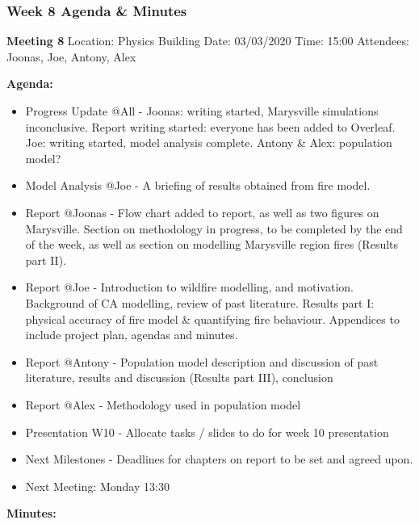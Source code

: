 \subsubsection*{Week 8 Agenda \& Minutes}
\textbf{Meeting 8}\newline
Location: Physics Building\newline
Date: 03/03/2020\newline
Time: 15:00\newline
Attendees: Joonas, Joe, Antony, Alex

\noindent \textbf{Agenda:}
\begin{itemize}
    \item Progress Update @All - Joonas: writing started, Marysville simulations inconclusive. Report writing started: everyone has been added to Overleaf. Joe: writing started, model analysis complete. Antony \& Alex: population model?
    \item Model Analysis @Joe - A briefing of results obtained from fire model.
    \item Report @Joonas - Flow chart added to report, as well as two figures on Marysville. Section on methodology in progress, to be completed by the end of the week, as well as section on modelling Marysville region fires (Results part II).
    \item Report @Joe - Introduction to wildfire modelling, and motivation. Background of CA modelling, review of past literature. Results part I: physical accuracy of fire model \& quantifying fire behaviour. Appendices to include project plan, agendas and minutes.
    \item Report @Antony - Population model description and discussion of past literature, results and discussion (Results part III), conclusion
    \item Report @Alex - Methodology used in population model
    \item Presentation W10 - Allocate tasks / slides to do for week 10 presentation
    \item Next Milestones - Deadlines for chapters on report to be set and agreed upon.
    \item Next Meeting: Monday 13:30
\end{itemize}
\textbf{Minutes:}
